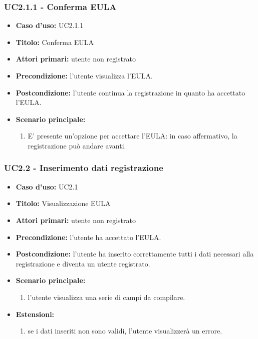\documentclass[casi-duso]{subfiles}
\begin{document}
\subsubsection{UC2.1.1 - Conferma EULA}
\label{subsub:uc2.1.1utente}
\begin{itemize}
  \item \textbf{Caso d’uso:} UC2.1.1 
  \item \textbf{Titolo:} Conferma EULA
  \item \textbf{Attori primari:} utente non registrato
  \item \textbf{Precondizione:} l'utente visualizza l'EULA.
  \item \textbf{Postcondizione:} l'utente continua la registrazione in quanto ha accettato l'EULA. 
  \item \textbf{Scenario principale:} 
  \begin{enumerate}
    \item E' presente un'opzione per accettare l'EULA: in caso affermativo, la registrazione può andare avanti. 
  \end{enumerate}    
\end{itemize}

\subsubsection{UC2.2 - Inserimento dati registrazione}
\label{subsub:uc2.2utente}
\begin{itemize}
  \item \textbf{Caso d’uso:} UC2.1 
  \item \textbf{Titolo:} Visualizzazione EULA
  \item \textbf{Attori primari:} utente non registrato
  \item \textbf{Precondizione:} l'utente ha accettato l'EULA.
  \item \textbf{Postcondizione:} l'utente ha inserito correttamente tutti i dati necessari alla registrazione e diventa un utente registrato. 
  \item \textbf{Scenario principale:} 
  \begin{enumerate}
    \item l'utente visualizza una serie di campi da compilare.
  \end{enumerate}
  \item \textbf{Estensioni:} 
  \begin{enumerate}
    \item se i dati inseriti non sono validi, l'utente visualizzerà un errore.
  \end{enumerate}     
\end{itemize}
\end{document}
